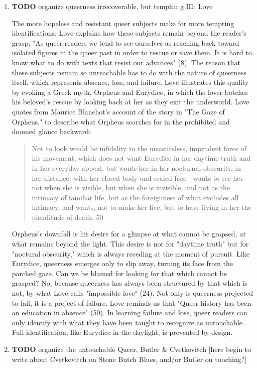 \documentclass[11pt]{article}
\begin{document}
\begin{enumerate}
\item {\bfseries\sffamily TODO} organize queerness irrecoverable, but temptin g ID: Love
\label{sec:org76506d9}

The more hopeless and resistant queer subjects make for more tempting
identifications. Love explains how these subjects remain beyond the
reader's grasp: "As queer readers we tend to see ourselves as reaching
back toward isolated figures in the queer past in order to rescue or
save them. It is hard to know what to do with texts that resist our
advances" (8). The reason that these subjects remain so unreachable
has to do with the nature of queerness itself, which represents
absence, loss, and failure. Love illustrates this quality by evoking a
Greek myth, Orpheus and Eurydice, in which the lover botches his
beloved's rescue by looking back at her as they exit the
underworld. Love quotes from Maurice Blanchot's account of the story
in "The Gaze of Orpheus," to describe what Orpheus searches for in the
prohibited and doomed glance backward:

\begin{quote}
Not to look would be infidelity to the measureless, imprudent force
of his movement, which does not want Eurydice in her daytime truth and
in her everyday appeal, but wants her in her nocturnal obscurity, in
her distance, with her closed body and sealed face---wants to see her
not when she is visible, but when she is invisible, and not as the
intimacy of familiar life, but as the foreignness of what excludes all
intimacy, and wants, not to make her live, but to have living in her
the plenditude of death. 50
\end{quote}

Orpheus's downfall is his desire for a glimpse at what cannot be
grapsed, at what remains beyond the light. This desire is not for
"daytime truth" but for "noctural obscurity," which is always receding
at the moment of pursuit. Like Eurydice, queerness emerges only to
slip away, turning its face from the parched gaze. Can we be blamed
for looking for that which cannot be grasped? No, because queerness
has always been structured by that which is not, by what Love calls
"impossible love" (24). Not only is queerness projected to fail, it is
a project of failure. Love reminds us that "Queer history has been an
education in absence" (50). In learning failure and loss, queer
readers can only identify with what they have been taught to recognize
as untouchable. Full identification, like Eurydice in the daylight, is
prevented by design.

\item {\bfseries\sffamily TODO} organize the untouchable Queer, Butler \& Cvetkovitch
\label{sec:orgc07ee0f}
[here begin to write about Cvetkovitch on Stone Butch Blues, and/or
Butler on touching?]
\end{enumerate}
\end{document}
